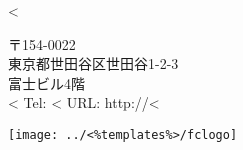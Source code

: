 \parbox[t]{.50\textwidth}{
\vspace{0.3cm}
 <%
}
\parbox[t]{.38\textwidth}{
\vspace{0.3cm}
        {〒154-0022 \\
        東京都世田谷区世田谷1-2-3 \\
        富士ビル4階 \\
        \Large <%
        \normalsize    Tel: <%
                                URL: http://<%
        }
}
\parbox[t]{.10\textwidth}{
\vspace{0.2cm}
   \texttt{[image: ../<\%templates\%>/fclogo]}
}
